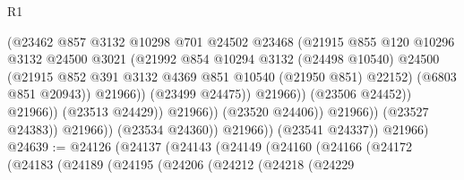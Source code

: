 \begin{lexlean}{R1}
\begin{coremodule}
                                            (@23462
                                              @857
                                              @3132
                                              @10298
                                              @701
                                              @24502
                                              @23468
                                              (@21915
                                                @855
                                                @120
                                                @10296
                                                @3132
                                                @24500
                                                @3021
                                                (@21992
                                                  @854
                                                  @10294
                                                  @3132
                                                  (@24498 @10540)
                                                  @24500
                                                  (@21915
                                                    @852
                                                    @391
                                                    @3132
                                                    @4369
                                                    @851
                                                    @10540
                                                    (@21950 @851)
                                                    @22152)
                                                  (@6803 @851 @20943))
                                                @21966))
                                            (@23499 @24475))
                                          @21966))
                                      (@23506 @24452))
                                    @21966))
                                (@23513 @24429))
                              @21966))
                          (@23520 @24406))
                        @21966))
                    (@23527 @24383))
                  @21966))
              (@23534 @24360))
            @21966))
        (@23541 @24337))
      @21966)
@24639 := @24126
    (@24137
      (@24143
        (@24149
          (@24160
            (@24166
              (@24172
                (@24183
                  (@24189
                    (@24195
                      (@24206
                        (@24212
                          (@24218
                            (@24229

\end{coremodule}
\end{lexlean}
